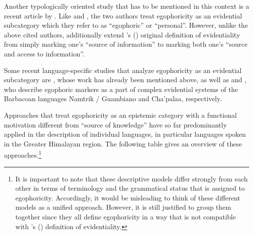 \documentclass[output=paper]{langsci/langscibook}
\begin{document}
Another typologically oriented study that has to be mentioned in this context is a recent article by \cite{TournadreLaPolla2014}. Like \cite{Plungian2010} and \cite{SanRoqueLoughnane2012}, the two authors treat egophoricity as an evidential subcategory which they refer to as “egophoric” or “personal”. However, unlike the above cited authors, \cite{TournadreLaPolla2014} additionally extend \citeauthor{Aikhenvald2004}’s (\citeyear{Aikhenvald2004}) original definition of evidentiality from simply marking one’s “source of information” to marking both one’s “source and access to information”.

Some recent language-specific studies that analyze egophoricity as an evidential subcategory are \cite{Loughnane2009}, whose work has already been mentioned above, as well as \cite{Norcliffe2018} and \cite{Floyd2018}, who describe egophoric markers as a part of complex evidential systems of the Barbacoan languages Namtrik / Guambiano and Cha’palaa, respectively.

Approaches that treat egophoricity as an epistemic category with a functional motivation different from “source of knowledge” have so far predominantly applied in the description of individual languages, in particular languages spoken in the Greater Himalayan region. The following table gives an overview of these approaches.\footnote{It is important to note that these descriptive models differ strongly from each other in terms of terminology and the grammatical status that is assigned to egophoricity. Accordingly, it would be misleading to think of these different models as a unified approach. However, it is still justified to group them together since they all define egophoricity in a way that is not compatible with \citeauthor{Aikhenvald2004}’s (\citeyear{Aikhenvald2004}) definition of evidentiality.}
\end{document}

